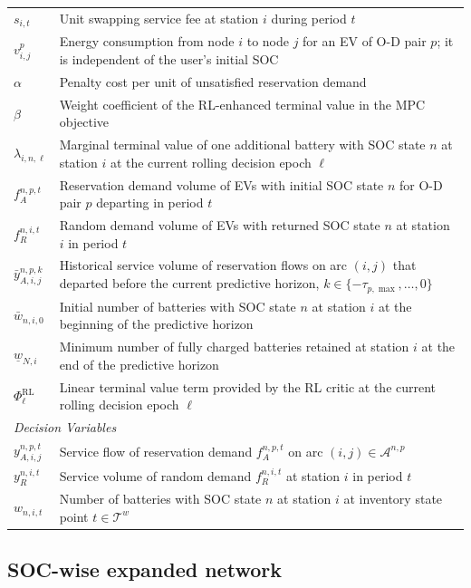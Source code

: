 \documentclass[12pt,hyperref,a4paper,UTF8]{ctexart}
\begin{document}
\begin{table}[!htbp]
\begin{tabular}{@{}lp{13cm}@{}}
    $s_{i,t}$ & Unit swapping service fee at station $i$ during period $t$ \\
    $v^{p}_{i,j}$ & Energy consumption from node $i$ to node $j$ for an EV of O-D pair $p$; it is independent of the user's initial SOC \\
    $\alpha$ & Penalty cost per unit of unsatisfied reservation demand \\
    $\beta$ & Weight coefficient of the RL-enhanced terminal value in the MPC objective \\
    $\lambda_{i,n,\ell}$ & Marginal terminal value of one additional battery with SOC state $n$ at station $i$ at the current rolling decision epoch $\ell$ \\
    $f_{A}^{n,p,t}$ & Reservation demand volume of EVs with initial SOC state $n$ for O-D pair $p$ departing in period $t$ \\
    $f_{R}^{n,i,t}$ & Random demand volume of EVs with returned SOC state $n$ at station $i$ in period $t$ \\
    $\bar{y}_{A,i,j}^{n,p,k}$ & Historical service volume of reservation flows on arc $(i,j)$ that departed before the current predictive horizon, $k\in\{-\tau_{p,\max},\dots,0\}$ \\
    $\bar{w}_{n,i,0}$ & Initial number of batteries with SOC state $n$ at station $i$ at the beginning of the predictive horizon \\
    $\underline{w}_{N,i}$ & Minimum number of fully charged batteries retained at station $i$ at the end of the predictive horizon \\
    $\Phi^{\mathrm{RL}}_{\ell}$ & Linear terminal value term provided by the RL critic at the current rolling decision epoch $\ell$ \\
    \midrule
    \multicolumn{2}{l}{\textit{Decision Variables}} \\
    $y_{A,i,j}^{n,p,t}$ & Service flow of reservation demand $f_{A}^{n,p,t}$ on arc $(i,j)\in\mathcal{A}^{n,p}$ \\
    $y_{R}^{n,i,t}$ & Service volume of random demand $f_{R}^{n,i,t}$ at station $i$ in period $t$ \\
    $w_{n,i,t}$ & Number of batteries with SOC state $n$ at station $i$ at inventory state point $t\in\mathcal{T}^{w}$ \\
    \bottomrule
  \end{tabular}
\end{table}

\subsection{SOC-wise expanded network}
\end{document}
